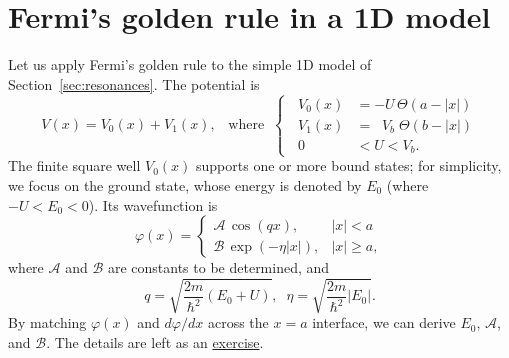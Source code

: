 \documentclass[prx,12pt]{revtex4-2}
\begin{document}
\section{Fermi's golden rule in a 1D model}
\label{sec:fgr1d}

Let us apply Fermi's golden rule to the simple 1D model of
Section~\ref{sec:resonances}.  The potential is
\begin{equation}
  V(x) = V_0(x) + V_1(x), \;\;\;\mathrm{where}\;\;
  \left\{\;\;
  \begin{aligned}
    V_0(x) &= -U \, \Theta(a-|x|) \\
    V_1(x) &= \;\;V_b\; \Theta(b-|x|) \\
    0 &<U<V_b.
  \end{aligned}\right.
\end{equation}
The finite square well $V_0(x)$ supports one or more bound states; for
simplicity, we focus on the ground state, whose energy is denoted by
$E_0$ (where $-U < E_0 < 0$).  Its wavefunction is
\begin{equation}
  \varphi(x) = \begin{cases}\mathcal{A}\,\cos(qx), & |x| < a \\
    \mathcal{B} \, \exp\left(-\eta|x|\right), & |x| \ge a,\end{cases}
  \label{varphiansatz0}
\end{equation}
where $\mathcal{A}$ and $\mathcal{B}$ are constants to be determined,
and
\begin{equation}
  q = \sqrt{\frac{2m}{\hbar^2}(E_0+U)}, \;\; \eta = \sqrt{\frac{2m}{\hbar^2}|E_0|}.
\end{equation}
By matching $\varphi(x)$ and $d\varphi/dx$ across the $x=a$ interface,
we can derive $E_0$, $\mathcal{A}$, and $\mathcal{B}$.  The details
are left as an \hyperref[ex:1dfgr]{exercise}.
\end{document}
